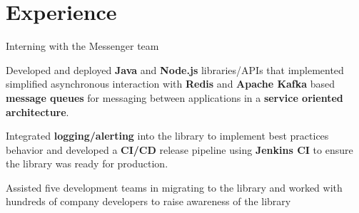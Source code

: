 \documentclass[letterpaper]{deedy-resume} %
\begin{document}
\hfill
%
%
\begin{minipage}[t]{0.66\textwidth} %


\section{Experience}


\vspace{\topsep} %
\begin{tightitemize}
\item Interning with the Messenger team
\end{tightitemize}

\sectionspace %



\begin{tightitemize}
\item Developed and deployed {\bf Java}  and {\bf Node.js} libraries/APIs that implemented simplified asynchronous interaction with {\bf Redis} and {\bf Apache Kafka} based {\bf message queues} for messaging between applications in a {\bf service oriented architecture}.
\item Integrated {\bf logging/alerting} into the library to implement best practices behavior and developed a {\bf CI/CD} release pipeline using {\bf Jenkins CI} to ensure the library was ready for production.
\item Assisted five development teams in migrating to the library and worked with hundreds of company developers to raise awareness of the library
\end{tightitemize}

\sectionspace %


\end{minipage}
\end{document}
